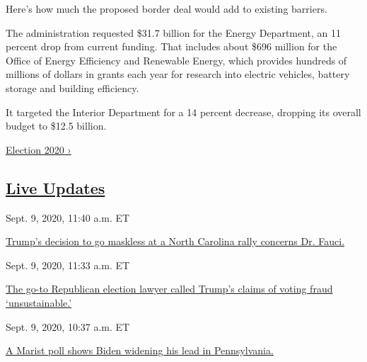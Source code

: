 Here's how much the proposed border deal would add to existing barriers.

The administration requested \$31.7 billion for the Energy Department,
an 11 percent drop from current funding. That includes about \$696
million for the Office of Energy Efficiency and Renewable Energy, which
provides hundreds of millions of dollars in grants each year for
research into electric vehicles, battery storage and building
efficiency.

It targeted the Interior Department for a 14 percent decrease, dropping
its overall budget to \$12.5 billion.

\href{https://www.nytimes3xbfgragh.onion/news-event/2020-election}{Election
2020 ›}

\hypertarget{live-updates}{%
\subsection{\texorpdfstring{\href{https://www.nytimes3xbfgragh.onion/live/2020/09/09/us/trump-vs-biden}{Live
Updates}}{Live Updates}}\label{live-updates}}

\href{https://www.nytimes3xbfgragh.onion/live/2020/09/09/us/trump-vs-biden\#trumps-decision-to-go-maskless-at-a-north-carolina-rally-concerns-dr-fauci}{}

Sept. 9, 2020, 11:40 a.m. ET

\href{https://www.nytimes3xbfgragh.onion/live/2020/09/09/us/trump-vs-biden\#trumps-decision-to-go-maskless-at-a-north-carolina-rally-concerns-dr-fauci}{Trump's
decision to go maskless at a North Carolina rally concerns Dr.
Fauci.}\href{https://www.nytimes3xbfgragh.onion/live/2020/09/09/us/trump-vs-biden\#the-go-to-republican-election-lawyer-called-trumps-claims-of-voting-fraud-unsustainable}{}

Sept. 9, 2020, 11:33 a.m. ET

\href{https://www.nytimes3xbfgragh.onion/live/2020/09/09/us/trump-vs-biden\#the-go-to-republican-election-lawyer-called-trumps-claims-of-voting-fraud-unsustainable}{The
go-to Republican election lawyer called Trump's claims of voting fraud
`unsustainable.'}\href{https://www.nytimes3xbfgragh.onion/live/2020/09/09/us/trump-vs-biden\#a-marist-poll-shows-biden-widening-his-lead-in-pennsylvania}{}

Sept. 9, 2020, 10:37 a.m. ET

\href{https://www.nytimes3xbfgragh.onion/live/2020/09/09/us/trump-vs-biden\#a-marist-poll-shows-biden-widening-his-lead-in-pennsylvania}{A
Marist poll shows Biden widening his lead in Pennsylvania.}

